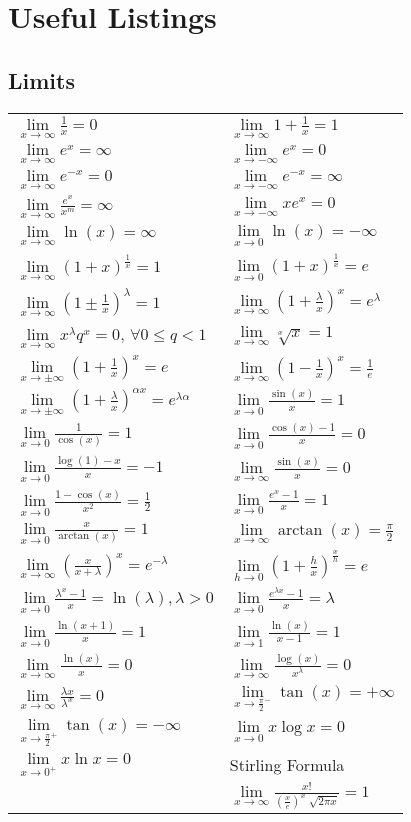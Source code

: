 \documentclass[a4paper, 10pt]{article}
\theoremstyle{definition}
\theoremstyle{ex}
\theoremstyle{named}
\begin{document}
\section*{Useful Listings}
\subsection*{Limits}
\newcommand{\limxi}{\lim\limits_{x\to\infty}}
\newcommand{\limxni}{\lim\limits_{x\to-\infty}}
\newcommand{\limx}{\lim\limits_{x\to\pm\infty}}
\newcommand{\limxz}{\lim\limits_{x\to0}}
\renewcommand{\arraystretch}{1.8}
\begin{tabularx}{\linewidth}{XX}
    $\limxi \frac{1}{x} = 0$ & $\limxi 1 + \frac{1}{x} = 1$ \\
    $\limxi e^x = \infty$ & $\limxni e^x = 0$ \\
    $\limxi e^{-x} = 0$ & $\limxni e^{-x} = \infty$ \\
    $\limxi \frac{e^x}{x^m} = \infty$ & $\limxni xe^x = 0$ \\
    $\limxi \ln(x) = \infty$ & $\limxz \ln(x) = -\infty$ \\
    $\limxi (1 + x)^\frac{1}{x} = 1$ & $\limxz (1 + x)^\frac{1}{x} = e$ \\
    $\limxi (1 \pm \frac{1}{x})^\lambda = 1$ & $\limxi (1 + \frac{\lambda}{x})^x = e^\lambda$ \\
    $\limxi x^\lambda q^x = 0$, $\forall 0 \leq q < 1$ & $\limxi \sqrt[x]{x} = 1$ \\
    $\limx (1 + \frac{1}{x})^x = e$ & $\limxi (1 - \frac{1}{x})^x = \frac{1}{e}$ \\
    $\limx (1 + \frac{\lambda}{x})^{\alpha x} = e^{\lambda \alpha}$ & $\limxz \frac{\sin(x)}{x} = 1$ \\
    $\limxz \frac{1}{\cos(x)} = 1$ & $\limxz \frac{\cos(x) - 1}{x} = 0$ \\
    $\limxz \frac{\log(1) - x}{x} = -1$ & $\limxi \frac{\sin(x)}{x} = 0$ \\
    $\limxz \frac{1 - \cos(x)}{x^2} = \frac{1}{2}$ & $\limxz \frac{e^x - 1}{x} = 1$ \\
    $\limxz \frac{x}{\arctan(x)} = 1$ & $\limxi \arctan(x) = \frac{\pi}{2}$ \\
    $\limxi (\frac{x}{x + \lambda})^x = e^{-\lambda}$ & $\lim\limits_{h \to 0} (1 + \frac{h}{x})^{\frac{x}{h}} = e$ \\
    $\limxz \frac{\lambda^x - 1}{x} = \ln(\lambda), \lambda > 0$ & $\limxz \frac{e^{\lambda x} - 1}{x} = \lambda$ \\
    $\limxz \frac{\ln(x+1)}{x} = 1$ & $\lim\limits_{x \to 1} \frac{\ln(x)}{x - 1} = 1$ \\
    $\limxi \frac{\ln(x)}{x} = 0$ & $\limxi \frac{\log(x)}{x^\lambda} = 0$ \\
    $\limxi \frac{\lambda x}{\lambda^x} = 0$ & $\lim\limits_{x \to \frac{\pi}{2}^-} \tan(x) = +\infty$\\
    $\lim\limits_{x \to \frac{\pi}{2}^+} \tan(x) = -\infty$ & $\limxz x \log x = 0$ \\
    $\lim\limits_{x \to 0^+} x \ln x = 0$ & Stirling Formula \\
    & $\limxi \frac{x!}{(\frac{x}{e})^x \sqrt[]{2 \pi x}} = 1$
\end{tabularx}
\end{document}
